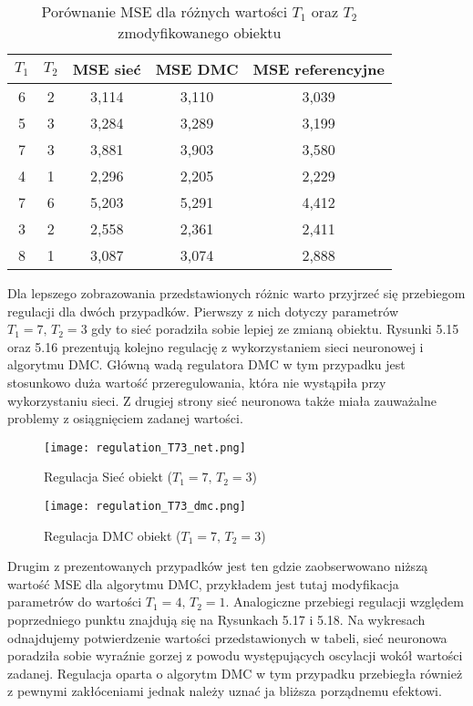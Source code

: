 \begin{table}[!h] \label{tab:tabela4} \centering
\caption{Porównanie MSE dla różnych wartości \(T_1\) oraz \(T_2\) zmodyfikowanego obiektu}
\begin{tabular} {| c | c | c | c | c |} \hline
    \(T_1\) & \(T_2\) & MSE sieć & MSE DMC & MSE referencyjne  \\ \hline\hline
    6 & 2 & 3,114 & 3,110 & 3,039 \\ \hline
    5 & 3 & 3,284 & 3,289 & 3,199 \\ \hline
    7 & 3 & 3,881 & 3,903 & 3,580 \\ \hline
    4 & 1 & 2,296 & 2,205 & 2,229 \\ \hline
    7 & 6 & 5,203 & 5,291 & 4,412 \\ \hline
    3 & 2 & 2,558 & 2,361 & 2,411 \\ \hline
    8 & 1 & 3,087 & 3,074 & 2,888 \\ \hline
\end{tabular}
\end{table}

\par Dla lepszego zobrazowania przedstawionych różnic warto przyjrzeć się przebiegom regulacji dla dwóch przypadków. Pierwszy z nich dotyczy parametrów \( T_1=7, \, T_2=3 \) gdy to sieć poradziła sobie lepiej ze zmianą obiektu. Rysunki 5.15 oraz 5.16 prezentują kolejno regulację z wykorzystaniem sieci neuronowej i algorytmu DMC. Główną wadą regulatora DMC w tym przypadku jest stosunkowo duża wartość przeregulowania, która nie wystąpiła przy wykorzystaniu sieci. Z drugiej strony sieć neuronowa także miała zauważalne problemy z osiągnięciem zadanej wartości.

\begin{figure}[!h]
\centering
\begin{minipage}{.5\textwidth}
  \label{fig:Regulation-T73-net}
  \centering \texttt{[image: regulation\_T73\_net.png]}
  \caption{Regulacja Sieć obiekt (\( T_1=7, \, T_2=3 \))}
  \label{fig:test1}
\end{minipage}%
\begin{minipage}{.5\textwidth}
  \label{fig:Regulation-T73-dmc}
  \centering \texttt{[image: regulation\_T73\_dmc.png]}
  \caption{Regulacja DMC obiekt (\( T_1=7, \, T_2=3 \))}
\end{minipage}
\end{figure}

\par Drugim z prezentowanych przypadków jest ten gdzie zaobserwowano niższą wartość MSE dla algorytmu DMC, przykładem jest tutaj modyfikacja parametrów do wartości \( T_1=4, \, T_2=1 \). Analogiczne przebiegi regulacji względem poprzedniego punktu znajdują się na Rysunkach 5.17 i 5.18. Na wykresach odnajdujemy potwierdzenie wartości przedstawionych w tabeli, sieć neuronowa poradziła sobie wyraźnie gorzej z powodu występujących oscylacji wokół wartości zadanej. Regulacja oparta o algorytm DMC w tym przypadku przebiegła również z pewnymi zakłóceniami jednak należy uznać ja bliższa porządnemu efektowi. 

